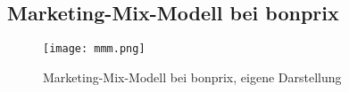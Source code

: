 \newpage
\subsection{Marketing-Mix-Modell bei bonprix} 

\begin{figure} [h]
    \centering
    \texttt{[image: mmm.png]}
    \caption{Marketing-Mix-Modell bei bonprix, eigene Darstellung}
    \label{fig:mmmbonprix}
\end{figure}

\newpage
